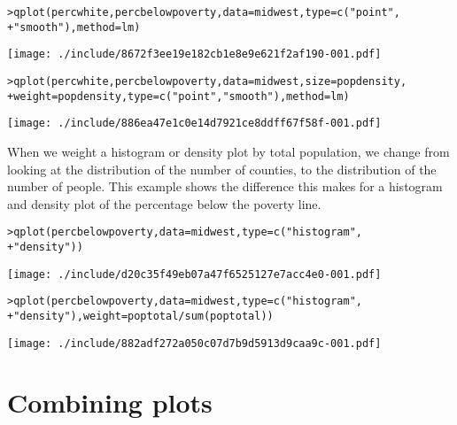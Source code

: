 \begin{alltt}
> qplot(percwhite, percbelowpoverty, data = midwest, type = c("point", 
+     "smooth"), method = lm)
\end{alltt}
\texttt{[image: ./include/8672f3ee19e182cb1e8e9e621f2af190-001.pdf]}
\begin{alltt}

> qplot(percwhite, percbelowpoverty, data = midwest, size = popdensity, 
+     weight = popdensity, type = c("point", "smooth"), method = lm)
\end{alltt}
\texttt{[image: ./include/886ea47e1c0e14d7921ce8ddff67f58f-001.pdf]}
\begin{alltt}

\end{alltt}

When we weight a histogram or density plot by total population, we change from looking at the distribution of the number of counties, to the distribution of the number of people.  This example shows the difference this makes for a histogram and density plot of the percentage below the poverty line.

\begin{alltt}
> qplot(percbelowpoverty, data = midwest, type = c("histogram", 
+     "density"))
\end{alltt}
\texttt{[image: ./include/d20c35f49eb07a47f6525127e7acc4e0-001.pdf]}
\begin{alltt}

> qplot(percbelowpoverty, data = midwest, type = c("histogram", 
+     "density"), weight = poptotal/sum(poptotal))
\end{alltt}
\texttt{[image: ./include/882adf272a050c07d7b9d5913d9caa9c-001.pdf]}
\begin{alltt}

\end{alltt}

\section{Combining plots}\label{sec:combining_plots}

